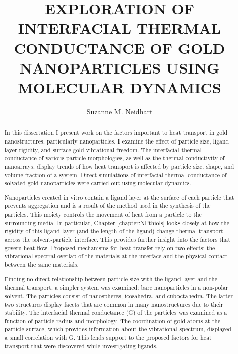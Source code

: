 \documentclass[noinfo,final,sort&compress]{nddiss2e}
\begin{document}
\frontmatter %

\title{EXPLORATION OF INTERFACIAL THERMAL CONDUCTANCE OF GOLD NANOPARTICLES USING MOLECULAR DYNAMICS}
\author{Suzanne M. Neidhart}
\maketitle


\begin{abstract}
In this dissertation I present work on the factors important to heat transport in gold nanostructures, particularly nanoparticles. I examine the effect of particle size, ligand layer rigidity, and surface gold vibrational freedom. The interfacial thermal conductance of various particle morphologies, as well as the thermal conductivity of nanoarrays, display trends of how heat transport is affected by particle size, shape, and volume fraction of a system.
Direct simulations of interfacial thermal conductance of solvated gold nanoparticles were carried out using molecular dynamics. 

Nanoparticles created in vitro contain a ligand layer at the surface of each particle that prevents aggregation and is a result of the method used in the synthesis of the particles. This moiety controls the movement of heat from a particle to the surrounding media. In particular, Chapter \ref{chapter:NPthiols} looks closely at how the rigidity of this ligand layer (and the length of the ligand) change thermal transport across the solvent-particle interface. This provides further insight into the factors that govern heat flow. Proposed mechanisms for heat transfer rely on two effects: the vibrational spectral overlap of the materials at the interface and the physical contact between the same materials.

Finding no direct relationship between particle size with the ligand layer and the thermal transport, a simpler system was examined: bare nanoparticles in a non-polar solvent.
The particles consist of nanospheres, icosahedra, and cuboctahedra. The latter two structures display facets that are common in many nanostructures due to their stability.
The interfacial thermal conductance (G) of the particles was examined as a function of particle radius and morphology. The coordination of gold atoms at the particle surface, which provides information about the vibrational spectrum, displayed a small correlation with G. This lends support to the proposed factors for heat transport that were discovered while investigating ligands.


\end{abstract}
\end{document}
